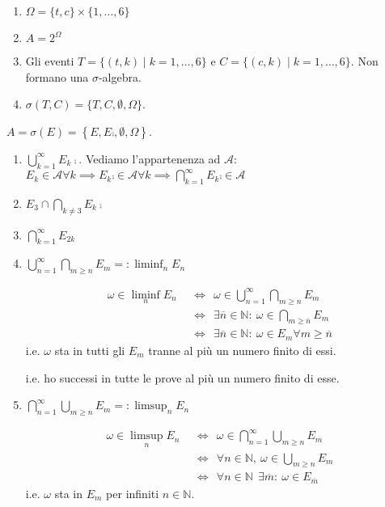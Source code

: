 \Soluzione
\begin{enumerate}
\item $\Omega =\{t,c\} \times \{1,\dotsc ,6\}$
\item $A=2^{\Omega }$
\item Gli eventi $T=\{( t,k) \mid k=1,\dotsc ,6\}$ e $C=\{( c,k) \mid k=1,\dotsc ,6\}$. Non formano una $\sigma $-algebra.
\item $\sigma ( T,C) =\{T,C,\emptyset ,\Omega \}$.
\end{enumerate}
\Soluzione

$A=\sigma ( E) =\left\{E,E\comp ,\emptyset ,\Omega \right\}$.
\Soluzione
\begin{enumerate}
\item $\bigcup\limits _{k=1}^{\infty } E_{k}\comp$. Vediamo l'appartenenza ad $\mathcal{A}$: $E_{k} \in \mathcal{A} \forall k\implies  E_{k}\comp \in \mathcal{A} \forall k\implies  \bigcap\limits _{k=1}^{\infty } E_{k}\comp \in \mathcal{A}$
\item $E_{3} \cap \bigcap\limits _{k\neq 3} E_{k}\comp$
\item $\bigcap\limits _{k=1}^{\infty } E_{2k}$
\item $\bigcup\limits _{n=1}^{\infty }\bigcap\limits _{m\geq n} E_{m} =:\liminf _{n} E_{n}$

\begin{oss}
\begin{equation*}
\begin{aligned}
\omega \in \liminf _{n} E_{n} & \ \ \iff \ \ \omega \in \bigcup _{n=1}^{\infty }\bigcap _{m\geq n} E_{m}\\
 & \ \ \iff \ \ \exists \overline{n} \in \mathbb{N} :\ \omega \in \bigcap _{m\geq \overline{n}} E_{m}\\
 & \ \ \iff \ \ \exists \overline{n} \in \mathbb{N} :\ \omega \in E_{m} \forall m\geq \overline{n}
\end{aligned}
\end{equation*}
i.e. $\omega $ sta in tutti gli $E_{m}$ tranne al più un numero finito di essi.

i.e. ho successi in tutte le prove al più un numero finito di esse.
\end{oss}
\item $\bigcap\limits _{n=1}^{\infty }\bigcup\limits _{m\geq n} E_{m} =:\limsup _{n} E_{n}$

\begin{oss}
\begin{equation*}
\begin{aligned}
\omega \in \limsup _{n} E_{n} & \ \ \iff \ \ \omega \in \bigcap _{n=1}^{\infty }\bigcup _{m\geq n} E_{m}\\
 & \ \ \iff \ \ \forall n\in \mathbb{N} ,\ \omega \in \bigcup _{m\geq n} E_{m}\\
 & \ \ \iff \ \ \forall n\in \mathbb{N} \ \ \exists \overline{m} :\ \omega \in E_{\overline{m}}
\end{aligned}
\end{equation*}
i.e. $\omega $ sta in $E_{m}$ per infiniti $n\in \mathbb{N}$.


\end{oss}
\end{enumerate}
